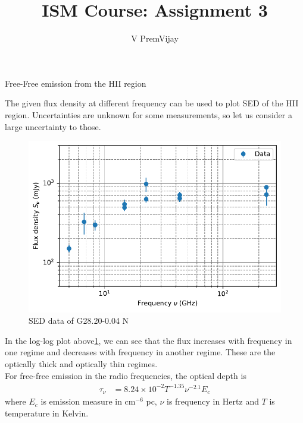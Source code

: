\documentclass{jhwhw}
\title{ISM Course: Assignment 3}
\author{V PremVijay}
\begin{document}
\maketitle

%


\problem
{Free-Free emission from the HII region}



\solution

The given flux density at different frequency can be used to plot SED of the HII region. Uncertainties are unknown for some measurements, so let us consider a large uncertainty to those.
\begin{figure}[H]
	\centering
	\label{fig:prob-1-plot1}
	\caption{SED data of G28.20-0.04 N}
	\includegraphics[width=1\linewidth]{../prob-1-plot1}
\end{figure}
In the log-log plot above\ref{fig:prob-1-plot1}, we can see that the flux increases with frequency in one regime and decreases with frequency in another regime. These are the optically thick and optically thin regimes.\\
For free-free emission in the radio frequencies, the optical depth is
\begin{align}
\label{prob-1-tau}
\tau_{\nu} &= 8.24 \times 10^{-2} T^{-1.35} \nu^{-2.1} E_{c} 
\end{align} 
where $E_{c}$ is emission measure in cm$^{-6}$ pc, $\nu$ is frequency in Hertz and $T$ is temperature in Kelvin.
\end{document}
